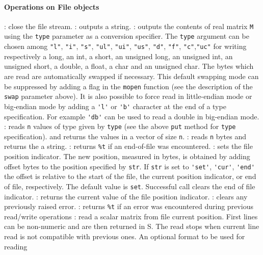 \paragraph{Operations on File objects}
\begin{itemize}
  : close the file stream.
  : outputs a string. 
  : outputs the contents of real matrix \verb+M+ using 
  the \verb!type! parameter as a conversion specifier. The \verb+type+ argument can be chosen 
  among \verb+"l"+, \verb+"i"+, \verb+"s"+, \verb+"ul"+, \verb+"ui"+, \verb+"us"+, \verb+"d"+, \verb+"f"+, 
  \verb+"c"+,\verb+"uc"+ for writing respectively a long, an int, a short, an unsigned long, 
  an unsigned int, an unsigned short, a double, a float, a char and an unsigned char. 
  The bytes which are read are automatically swapped if necessary. 
  This default swapping mode can be suppressed by adding a flag in the \verb!mopen! function 
  (see the description of the \verb+swap+ parameter above).
  It is also possible to force read in little-endian mode or big-endian mode by adding a \verb+'l'+ or \verb+'b'+  
  character at the end of a type specification. For example \verb+'db'+ can be used to read a double 
  in big-endian mode. 
  : reads \verb+n+ values of type given by \verb+type+ 
  (see the above \verb+put+ method for \verb+type+ specification).
  and returns the values in a vector of size \verb+n+. 
  : reads \verb+n+ bytes and returns the a string.
  : returns \verb+%t+ if an end-of-file was encountered. 
  :  sets  the  file  position indicator. The new position, 
  measured in bytes, is obtained by adding offset bytes to  the
  position  specified by \verb+str+. If \verb+str+ is set to \verb+'set'+, \verb+'cur'+, 
  \verb+'end'+ the offset is relative to the start of the file, 
  the current position indicator, or  end of file,  respectively. The default value 
  is \verb+set+.
  Successful call clears the end of file indicator.
  : returns the current value of the file position indicator. 
  : clears any previously raised error.
  : returns \verb+%t+ if an error was encountered during previous read/write 
  operations 
  : read a scalar matrix from file current position. 
  First lines can be non-numeric and are then returned in S. The read stops when current 
  line read is not compatible with previous ones. An optional format to be used for reading

\end{itemize}
